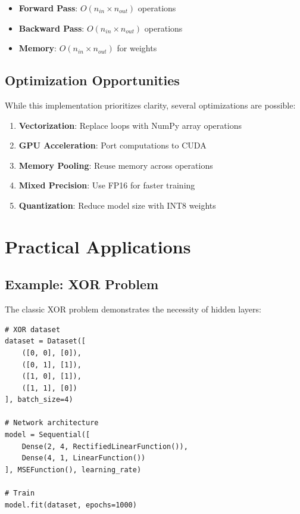 \documentclass[12pt,a4paper]{article}
\begin{document}
\begin{itemize}
    \item \textbf{Forward Pass}: $O(n_{in} \times n_{out})$ operations
    \item \textbf{Backward Pass}: $O(n_{in} \times n_{out})$ operations
    \item \textbf{Memory}: $O(n_{in} \times n_{out})$ for weights
\end{itemize}

\subsection{Optimization Opportunities}

While this implementation prioritizes clarity, several optimizations are possible:

\begin{enumerate}
    \item \textbf{Vectorization}: Replace loops with NumPy array operations
    \item \textbf{GPU Acceleration}: Port computations to CUDA
    \item \textbf{Memory Pooling}: Reuse memory across operations
    \item \textbf{Mixed Precision}: Use FP16 for faster training
    \item \textbf{Quantization}: Reduce model size with INT8 weights
\end{enumerate}

\section{Practical Applications}

\subsection{Example: XOR Problem}

The classic XOR problem demonstrates the necessity of hidden layers:

\begin{lstlisting}[caption={Training a network to learn XOR}]
# XOR dataset
dataset = Dataset([
    ([0, 0], [0]),
    ([0, 1], [1]),
    ([1, 0], [1]),
    ([1, 1], [0])
], batch_size=4)

# Network architecture
model = Sequential([
    Dense(2, 4, RectifiedLinearFunction()),
    Dense(4, 1, LinearFunction())
], MSEFunction(), learning_rate)

# Train
model.fit(dataset, epochs=1000)
\end{lstlisting}
\end{document}
